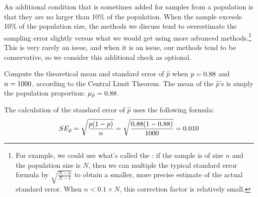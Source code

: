 An additional condition that is sometimes added for samples
from a population is that they are no larger than 10\% of
the population.
When the sample exceeds 10\% of the population size,
the methods we discuss tend to overestimate the sampling error
slightly versus what we would get using more advanced
methods.\footnote{For example, we could use what's called the
  :
  if the sample is of size $n$ and the population size is $N$,
  then we can multiple the typical standard error formula by
  $\sqrt{\frac{N-n}{N-1}}$
  to obtain a smaller, more precise estimate of the
  actual standard error.
  When $n < 0.1 \times N$, this correction factor is
  relatively small.}
This is very rarely an issue, and when it is an issue,
our methods tend to be conservative, so we consider this
additional check as optional.

\begin{examplewrap}
\begin{nexample}{Compute the theoretical mean and standard error
of $\hat{p}$ when
$p = 0.88{}$ and $n = 1000{}$,
according to the
Central Limit Theorem.}\label{sample_p88_n1000_mean_se}
The mean of the $\hat{p}$'s is simply the population proportion:
$\mu_{\hat{p}} = 0.88{}$.

The calculation of the standard error of $\hat{p}$ uses
the following formula:
\begin{align*}
SE_{\hat{p}}
    = \sqrt{\frac{p (1 - p)}{n}}
    = \sqrt{\frac{0.88{} (1 - 0.88{})}
        {1000{}}}
    = 0.010{}
\end{align*}
\end{nexample}
\end{examplewrap}

